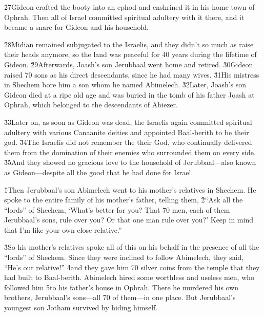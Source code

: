 \v{27}Gideon crafted the booty into an ephod and enshrined it in his home town of Ophrah. Then all of Israel committed spiritual adultery with it there, and it became a snare for Gideon and his household.

\v{28}Midian remained subjugated to the Israelis, and they didn't so much as raise their heads anymore, so the land was peaceful for 40 years during the lifetime of Gideon. \v{29}Afterwards, Joash's son Jerubbaal went home and retired. \v{30}Gideon raised 70 sons as his direct descendants, since he had many wives. \v{31}His mistress in Shechem bore him a son whom he named Abimelech. \v{32}Later, Joash's son Gideon died at a ripe old age and was buried in the tomb of his father Joash at Ophrah, which belonged to the descendants of Abiezer.

\v{33}Later on, as soon as Gideon was dead, the Israelis again committed spiritual adultery with various Canaanite deities and appointed Baal-berith to be their god. \v{34}The Israelis did not remember the  their God, who continually delivered them from the domination of their enemies who surrounded them on every side. \v{35}And they showed no gracious love to the household of Jerubbaal---also known as Gideon---despite all the good that he had done for Israel.

\v{1}Then Jerubbaal's son Abimelech went to his mother's relatives in Shechem. He spoke to the entire family of his mother's father, telling them, \v{2}``Ask all the ``lords'' of Shechem, `What's better for you? That 70 men, each of them Jerubbaal's sons, rule over you? Or that one man rule over you?' Keep in mind that I'm like your own close relative.''

\v{3}So his mother's relatives spoke all of this on his behalf in the presence of all the ``lords'' of Shechem. Since they were inclined to follow Abimelech, they said, ``He's our relative!'' \v{4}and they gave him 70 silver coins from the temple that they had built to Baal-berith. Abimelech hired some worthless and useless men, who followed him \v{5}to his father's house in Ophrah. There he murdered his own brothers, Jerubbaal's sons---all 70 of them---in one place. But Jerubbaal's youngest son Jotham survived by hiding himself.

